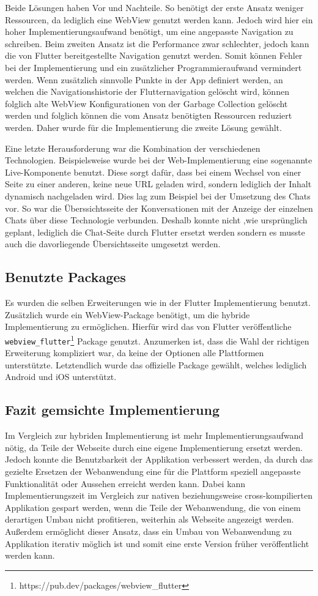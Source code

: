 Beide Lösungen haben Vor und Nachteile. So benötigt der erste Ansatz weniger Ressourcen, da lediglich eine WebView genutzt werden kann. Jedoch wird hier ein hoher Implementierungsaufwand benötigt, um eine angepasste Navigation zu schreiben. 
Beim zweiten Ansatz ist die Performance zwar schlechter, jedoch kann die von Flutter bereitgestellte Navigation genutzt werden. Somit können Fehler bei der Implementierung und ein zusätzlicher Programmieraufwand vermindert werden.
Wenn zusätzlich sinnvolle Punkte in der App definiert werden, an welchen die Navigationshistorie der Flutternavigation gelöscht wird, können folglich alte WebView Konfigurationen von der Garbage Collection gelöscht werden und folglich können die vom Ansatz benötigten Ressourcen reduziert werden. Daher wurde für die Implementierung die zweite Lösung gewählt. 

Eine letzte Herausforderung war die Kombination der verschiedenen Technologien. Beispielsweise wurde bei der Web-Implementierung eine sogenannte Live-Komponente benutzt. Diese sorgt dafür, dass bei einem Wechsel von einer Seite zu einer anderen, keine neue URL geladen wird, sondern lediglich der Inhalt dynamisch nachgeladen wird. Dies lag zum Beispiel bei der Umsetzung des Chats vor. So war die Überssichtsseite der Konversationen mit der Anzeige der einzelnen Chats über diese Technologie verbunden. Deshalb konnte nicht ,wie ursprünglich geplant, lediglich die Chat-Seite durch Flutter ersetzt werden sondern es musste auch die davorliegende Übersichtsseite umgesetzt werden.

\subsection{Benutzte Packages}
Es wurden die selben Erweiterungen wie in der Flutter Implementierung benutzt. Zusätzlich wurde ein WebView-Package benötigt, um die hybride Implementierung zu ermöglichen. Hierfür wird das von Flutter veröffentliche \verb|webview_flutter|\footnote{https://pub.dev/packages/webview\_flutter} Package genutzt. Anzumerken ist, dass die Wahl der richtigen Erweiterung kompliziert war, da keine der Optionen alle Plattformen unterstützte. Letztendlich wurde das offizielle Package gewählt, welches lediglich Android und iOS unterstützt.

\subsection{Fazit gemsichte Implementierung}
Im Vergleich zur hybriden Implementierung ist mehr Implementierungsaufwand nötig, da Teile der Webseite durch eine eigene Implementierung ersetzt werden. Jedoch konnte die Benutzbarkeit der Applikation verbessert werden, da durch das gezielte Ersetzen der Webanwendung eine für die Plattform speziell angepasste Funktionalität oder Aussehen erreicht werden kann. Dabei kann Implementierungszeit im Vergleich zur nativen beziehungsweise cross-kompilierten Applikation gespart werden, wenn die Teile der Webanwendung, die von einem derartigen Umbau nicht profitieren, weiterhin als Webseite angezeigt werden.
Außerdem ermöglicht dieser Ansatz, dass ein Umbau von Webanwendung zu Applikation iterativ möglich ist und somit eine erste Version früher veröffentlicht werden kann.

